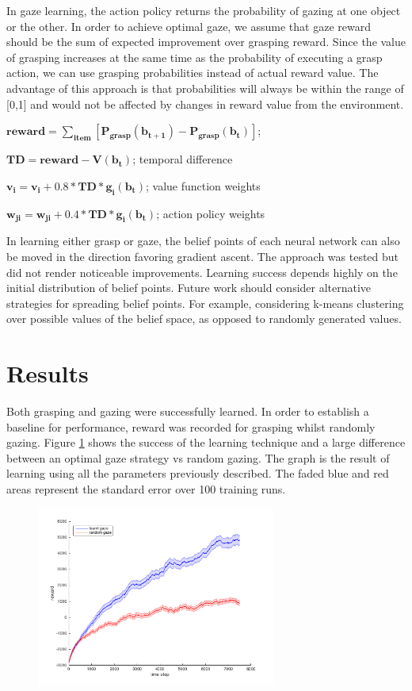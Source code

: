 \documentclass[11]{article}
\begin{document}
In gaze learning, the action policy returns the probability of gazing at one object or the other. In order to achieve optimal gaze, we assume that gaze reward should be the sum of expected improvement over grasping reward. Since the value of grasping increases at the same time as the probability of executing a grasp action, we can use grasping probabilities instead of actual reward value. The advantage of this approach is that probabilities will always be within the range of [0,1] and would not be affected by changes in reward value from the environment. 
\begin{list}{}{}
  \item $\pmb{reward = \sum_{item}[P_{grasp}(b_{t+1}) -  P_{grasp}(b_t)] }$; 
  \item $\pmb{TD = reward - V(b_t)}$; temporal difference
  \item $\pmb{ v_i = v_i + 0.8 * TD * g_i(b_t)}$; value function weights
  \item $\pmb{w_{ji} = w_{ji}+ 0.4 * TD * g_i(b_t)}$; action policy weights
\end{list}  

In learning either grasp or gaze, the belief points of each neural network can also be moved in the direction favoring gradient ascent\cite{rashejrao}. The approach was tested but did not render noticeable improvements. Learning success depends highly on the initial distribution of belief points. Future work should consider alternative strategies for spreading belief points. For example, considering k-means clustering over possible values of the belief space, as opposed to randomly generated values.

\pagebreak

\section{Results}
Both grasping and gazing were successfully learned. In order to establish a baseline for performance, reward was recorded for grasping whilst randomly gazing. 
Figure \ref{fig:results} shows the success of the learning technique and a large difference between an optimal gaze strategy vs random gazing. The graph is the result of learning using all the parameters previously described. The faded blue and red areas represent the standard error over 100 training runs.
%
\begin{figure}[h]
	\centering
	\includegraphics[width=0.7\textwidth]{figures/results.png}
	\caption{}
	\label{fig:results}
\end{figure}
\end{document}
